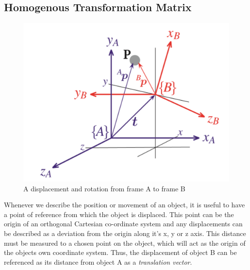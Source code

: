\documentclass{UoNMCHA}
\numberwithin{equation}{section}
\begin{document}
\subsection{Homogenous Transformation Matrix}\label{Homogenous Transformation Matrix}

\begin{figure}[H]
	\begin{center}
		\includegraphics[width=.6\linewidth]{Figures/TransformationMatrix}
		\caption{A displacement and rotation from frame A to frame B}
		\label{fig:TransformationMatrix}
	\end{center}
\end{figure}

Whenever we describe the position or movement of an object, it is useful to have a point of reference from which the object is displaced. This point can be the origin of an orthogonal Cartesian co-ordinate system and any displacements can be described as a deviation from the origin along it’s x, y or z axis. This distance must be measured to a chosen point on the object, which will act as the origin of the objects own coordinate system. Thus, the displacement of object B can be referenced as its distance from object A as a  \textit{translation vector}. 
\end{document}
